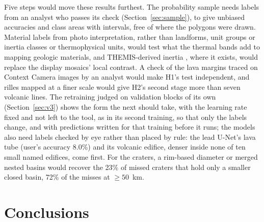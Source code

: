 \documentclass[twocolumn]{aastex701}
\begin{document}
Five steps would move these results furthest. The probability sample needs labels from an analyst who passes its
check (Section~\ref{sec:sample}), to give unbiased accuracies and class areas with intervals, free of where the
polygons were drawn. Material labels from photo interpretation, rather than landforms, unit groups or inertia
classes or thermophysical units, would test what the thermal bands add to mapping geologic materials, and THEMIS-derived inertia \citep{Fergason2006}, where it exists,
would replace the display mosaics' local contrast. A check of the lava margins traced on Context Camera images
\citep{Malin2007} by an analyst would make H1's test independent, and rilles mapped at a finer scale would give H2's
second stage more than seven volcanic lines. The retraining judged on validation blocks of its own (Section~\ref{sec:v3}) shows the form the next should take,
with the learning rate fixed and not left to the tool, as in its second training, so that only the labels change, and
with predictions written for that training before it runs; the models also need labels
checked by eye rather than placed by rule: the lead U-Net's lava tube (user's accuracy 8.0\%) and its volcanic
edifice, denser inside none of ten small named edifices, come first. For the craters, a rim-based diameter or merged
nested basins would recover the 23\% of missed craters that hold only a smaller closed basin, 72\% of the
misses at $\ge50$~km.

\section{Conclusions} \label{sec:conclusions}
\end{document}
